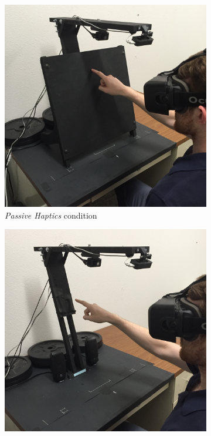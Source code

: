 \documentclass[]{aiaa-tc}%
\begin{document}
\begin{figure}[tb]
  \centering
  \begin{subfigure}{.32\textwidth}
    \centering
    \includegraphics[width=.99\linewidth]{figures/passive_haptics.jpg}
    \caption{\textit{Passive Haptics} condition}
    \label{fig:passive_haptics}
  \end{subfigure}
  \begin{subfigure}{.32\textwidth}
    \centering
    \includegraphics[width=.99\linewidth]{figures/no_passive_haptics.jpg}

\end{subfigure}
\end{figure}
\end{document}
